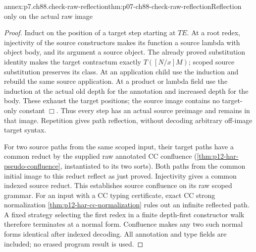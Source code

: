 \begin{annexitem}{annex:p7.ch88.check-raw-reflection}{thm:p07-ch88-check-raw-reflection}{Reflection only on the actual raw image}
\begin{proof}
Induct on the position of a target step starting at \(TE\). At a
root redex, injectivity of the source constructors makes its function
a source lambda with object body, and its argument a source object.
The already proved substitution identity makes the target contractum
exactly \(T([N/x]M)\); scoped source substitution preserves its
class. At an application child use the induction and rebuild the same
source application. At a product or lambda field use the induction at
the actual old depth for the annotation and increased depth for the
body. These exhaust the target positions; the source image contains
no target-only constant \(\Box\). Thus every step has an actual
source preimage and remains in that image. Repetition gives path
reflection, without decoding arbitrary off-image target syntax.

For two source paths from the same scoped input, their target paths
have a common reduct by the supplied raw annotated CC confluence
(\cref{thm:p12-har-pseudo-confluence}, instantiated to its two sorts).
Both paths from the common initial image to this reduct reflect as
just proved. Injectivity gives a common indexed source reduct. This
establishes source confluence on its raw scoped grammar. For an input
with a CC typing certificate, exact CC strong normalization
\cref{thm:p12-har-cc-normalization} rules out an infinite reflected
path. A fixed strategy selecting the first redex in a finite
depth-first constructor walk therefore terminates at a normal form.
Confluence makes any two such normal forms identical after indexed
decoding. All annotation and type fields are included; no erased
program result is used.
\end{proof}
\end{annexitem}

